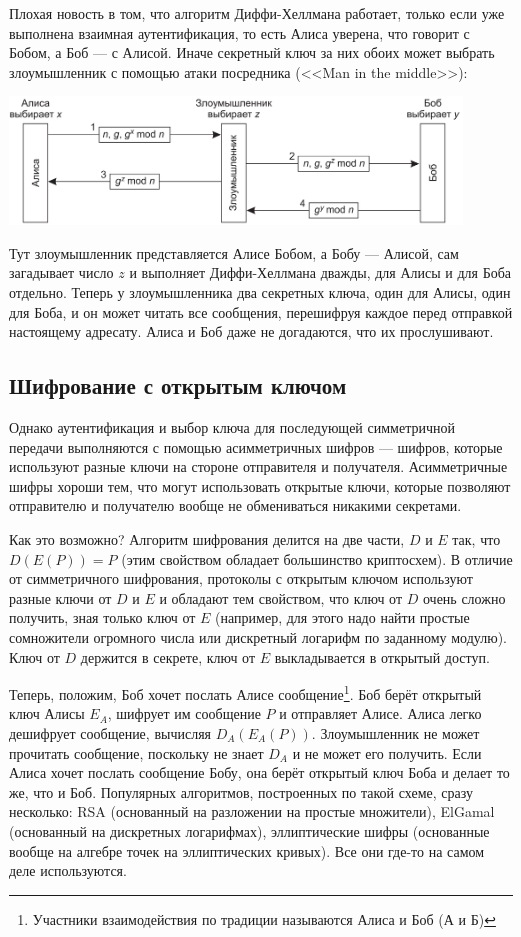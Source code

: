 \documentclass{../../text-style}
\begin{document}
Плохая новость в том, что алгоритм Диффи-Хеллмана работает, только если уже выполнена взаимная аутентификация, то есть Алиса уверена, что говорит с Бобом, а Боб --- с Алисой. Иначе секретный ключ за них обоих может выбрать злоумышленник с помощью атаки посредника (<<Man in the middle>>):

\begin{center}
    \includegraphics[width=0.9\textwidth]{diffieHellmanMitm.png}
\end{center}

Тут злоумышленник представляется Алисе Бобом, а Бобу --- Алисой, сам загадывает число $z$ и выполняет Диффи-Хеллмана дважды, для Алисы и для Боба отдельно. Теперь у злоумышленника два секретных ключа, один для Алисы, один для Боба, и он может читать все сообщения, перешифруя каждое перед отправкой настоящему адресату. Алиса и Боб даже не догадаются, что их прослушивают.

\subsection{Шифрование с открытым ключом}

Однако аутентификация и выбор ключа для последующей симметричной передачи выполняются с помощью асимметричных шифров --- шифров, которые используют разные ключи на стороне отправителя и получателя. Асимметричные шифры хороши тем, что могут использовать открытые ключи, которые позволяют отправителю и получателю вообще не обмениваться никакими секретами. 

Как это возможно? Алгоритм шифрования делится на две части, $D$ и $E$ так, что $D(E(P)) = P$ (этим свойством обладает большинство криптосхем). В отличие от симметричного шифрования, протоколы с открытым ключом используют разные ключи от $D$ и $E$ и обладают тем свойством, что ключ от $D$ очень сложно получить, зная только ключ от $E$ (например, для этого надо найти простые сомножители огромного числа или дискретный логарифм по заданному модулю). Ключ от $D$ держится в секрете, ключ от $E$ выкладывается в открытый доступ.

Теперь, положим, Боб хочет послать Алисе сообщение\footnote{Участники взаимодействия по традиции называются Алиса и Боб (А и Б)}. Боб берёт открытый ключ Алисы $E_A$, шифрует им сообщение $P$ и отправляет Алисе. Алиса легко дешифрует сообщение, вычисляя $D_A(E_A(P))$. Злоумышленник не может прочитать сообщение, поскольку не знает $D_A$ и не может его получить. Если Алиса хочет послать сообщение Бобу, она берёт открытый ключ Боба и делает то же, что и Боб. Популярных алгоритмов, построенных по такой схеме, сразу несколько: RSA (основанный на разложении на простые множители), ElGamal (основанный на дискретных логарифмах), эллиптические шифры (основанные вообще на алгебре точек на эллиптических кривых). Все они где-то на самом деле используются.
\end{document}
